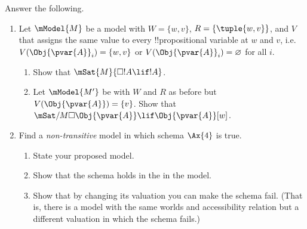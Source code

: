\documentclass[../../../../include/open-logic-section]{subfiles}
\begin{document}
\begin{prob}
Answer the following.
\begin{enumerate}
	\item Let $\mModel{M}$ be a model with $W=\{w,v\}$,
	$R=\{\tuple{w,v}\}$, and $V$ that assigns the same
	value to every !!{propositional variable} at $w$ 
	and $v$, i.e. $V(\Obj{\pvar{A}}_i) = \{w,v\}$ or $V(\Obj{\pvar{A}}_i) = \varnothing$ 
	for all $i$.
	\begin{enumerate}
		\item Show that $\mSat{M}{\Box !A \lif !A}$.
		\item Let $\mModel{M'}$ be with $W$ and $R$ as before
		but $V(\Obj{\pvar{A}})=\{v\}$. Show that 
		$\mSat/{M}{\Box \Obj{\pvar{A}} \lif \Obj{\pvar{A}}}[w]$.
	\end{enumerate}
	\item Find a \emph{non-transitive} model in 
	which schema $\Ax{4}$ is true. 
	\begin{enumerate}
		\item State your proposed model. 
		\item Show that the schema holds in the
		in the model.
		\item Show that by changing its valuation you 
		can make the schema fail. (That is, there is a model with
		the same worlds and accessibility relation but a different
		valuation in which the schema fails.)
	\end{enumerate}
\end{enumerate}

\end{prob}
\end{document}
